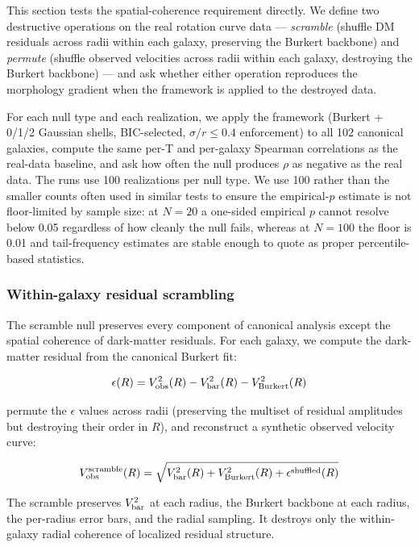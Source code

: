 \documentclass[linenumbers,trackchanges]{aastex701}
\begin{document}
This section tests the spatial-coherence requirement directly. We define two destructive operations on the real rotation curve data --- \emph{scramble} (shuffle DM residuals across radii within each galaxy, preserving the Burkert backbone) and \emph{permute} (shuffle observed velocities across radii within each galaxy, destroying the Burkert backbone) --- and ask whether either operation reproduces the morphology gradient when the framework is applied to the destroyed data.

For each null type and each realization, we apply the framework (Burkert + 0/1/2 Gaussian shells, BIC-selected, $\sigma/r \le 0.4$ enforcement) to all 102 canonical galaxies, compute the same per-T and per-galaxy Spearman correlations as the real-data baseline, and ask how often the null produces $\rho$ as negative as the real data. The runs use 100 realizations per null type. We use 100 rather than the smaller counts often used in similar tests to ensure the empirical-$p$ estimate is not floor-limited by sample size: at $N = 20$ a one-sided empirical $p$ cannot resolve below 0.05 regardless of how cleanly the null fails, whereas at $N = 100$ the floor is 0.01 and tail-frequency estimates are stable enough to quote as proper percentile-based statistics.

\subsubsection{Within-galaxy residual scrambling}

The scramble null preserves every component of canonical analysis except the spatial coherence of dark-matter residuals. For each galaxy, we compute the dark-matter residual from the canonical Burkert fit:

\begin{equation}
\epsilon(R) = V_{\rm obs}^2(R) - V_{\rm bar}^2(R) - V_{\rm Burkert}^2(R)
\end{equation}

permute the $\epsilon$ values across radii (preserving the multiset of residual amplitudes but destroying their order in $R$), and reconstruct a synthetic observed velocity curve:

\begin{equation}
V_{\rm obs}^{\rm scramble}(R) = \sqrt{V_{\rm bar}^2(R) + V_{\rm Burkert}^2(R) + \epsilon^{\rm shuffled}(R)}
\end{equation}

The scramble preserves $V_{\rm bar}^2$ at each radius, the Burkert backbone at each radius, the per-radius error bars, and the radial sampling. It destroys only the within-galaxy radial coherence of localized residual structure.
\end{document}
